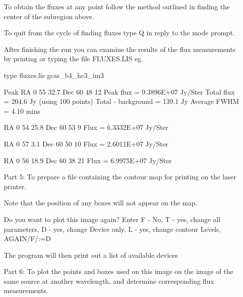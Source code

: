 \documentclass[nolof,noabs,11pt]{starlink}
\begin{document}
\begin{itemize}
To obtain the fluxes at any point follow the method outlined in finding the
center of the subregion above.

To quit from the cycle of finding fluxes type Q in reply to the mode prompt.

After finishing the run you can examine the results of the flux measurements
by printing or typing the file FLUXES.LIS eg.

\begin{terminalv}
type fluxes.lis
  gcas_b4_hc3_im3

  Peak  RA   0 55 32.7      Dec  60 48 12
  Peak flux  =  9.3896E+07  Jy/Ster
  Total flux =   204.6      Jy
  (using   100  points)
  Total - background =   139.1      Jy
  Average FWHM =  4.10 mins

  RA   0 54 25.8       Dec  60 53  9
  Flux  =  6.3332E+07  Jy/Ster

  RA   0 57  3.1       Dec  60 50 10
  Flux  =  2.6011E+07  Jy/Ster

  RA   0 56 18.9       Dec  60 38 21
  Flux  =  6.9975E+07  Jy/Ster
\end{terminalv}

\pagebreak
\item [Part 5:] To prepare a file containing the contour map for printing on the
laser printer.

Note that the position of any boxes will not appear on the map.

\begin{terminalv}
Do you want to plot this image again?
Enter F - No,
     T - yes, change all parameters,
     D - yes, change Device only,
     L - yes, change contour Levels,
AGAIN/F/:=D
\end{terminalv}

The program will then print out a list of available devices


\item [Part 6:] To plot the points and boxes used on this image on the image of
the same source at another wavelength, and determine corresponding flux
measurements.


\end{itemize}
\end{document}
